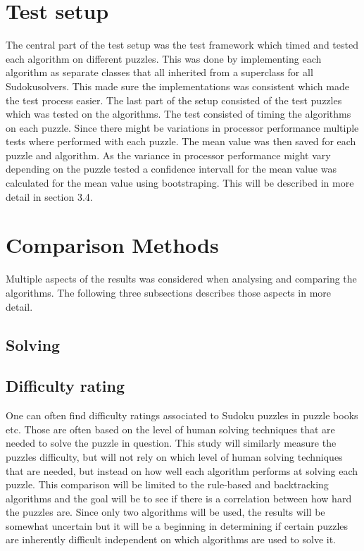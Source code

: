 \documentclass[a4paper,11pt]{kth-mag}
\begin{document}
\section{Test setup}
The central part of the test setup was the test framework which timed and tested each algorithm on different puzzles. 
This was done by implementing each algorithm as separate classes that all inherited from a superclass for all Sudokusolvers.
This made sure the implementations was consistent which made the test process easier.
The last part of the setup consisted of the test puzzles which was tested on the algorithms.
The test consisted of timing the algorithms on each puzzle. 
Since there might be variations in processor performance multiple tests where performed with each puzzle. 
The mean value was then saved for each puzzle and algorithm.
As the variance in processor performance might vary depending on the puzzle tested a confidence intervall for the mean value was calculated for the mean value using bootstraping. 
This will be described in more detail in section 3.4.

\section{Comparison Methods}
Multiple aspects of the results was considered when analysing and comparing the algorithms. The following three subsections describes those aspects in more detail. 
\subsection{Solving}
\subsection{Difficulty rating}
One can often find difficulty ratings associated to Sudoku puzzles in puzzle books etc. Those are often based on the level of human solving techniques that are needed to solve the puzzle in question. \cite{difficulty} 
This study will similarly measure the puzzles difficulty, but will not rely on which level of human solving techniques that are needed, but instead on how well each algorithm performs at solving each puzzle. 
This comparison will be limited to the rule-based and backtracking algorithms and the goal will be to see if there is a correlation between how hard the puzzles are. 
Since only two algorithms will be used, the results will be somewhat uncertain but it will be a beginning in determining if certain puzzles are inherently difficult independent on which algorithms are used to solve it.
\end{document}
